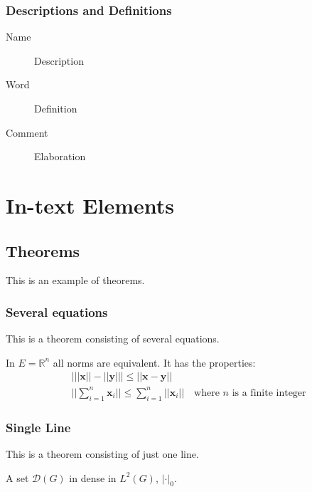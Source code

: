 \subsection{Descriptions and Definitions}

\begin{description}
\item[Name] Description
\item[Word] Definition
\item[Comment] Elaboration
\end{description}


\chapter{In-text Elements}

\section{Theorems}

This is an example of theorems.

\subsection{Several equations}
This is a theorem consisting of several equations.

\begin{theorem}
In $E=\mathbb{R}^n$ all norms are equivalent. It has the properties:
\begin{align}
& \big| ||\mathbf{x}|| - ||\mathbf{y}|| \big|\leq || \mathbf{x}- \mathbf{y}||\\
&  ||\sum_{i=1}^n\mathbf{x}_i||\leq \sum_{i=1}^n||\mathbf{x}_i||\quad\text{where $n$ is a finite integer}
\end{align}
\end{theorem}

\subsection{Single Line}
This is a theorem consisting of just one line.

\begin{theorem}
A set $\mathcal{D}(G)$ in dense in $L^2(G)$, $|\cdot|_0$. 
\end{theorem}

